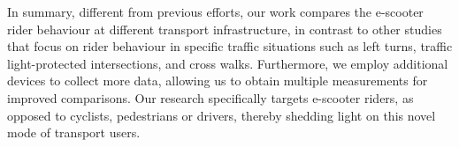 In summary, different from previous efforts, our work compares the e-scooter rider behaviour at different transport infrastructure, in contrast to other studies that focus on rider behaviour in specific traffic situations such as left turns, traffic light-protected intersections, and cross walks. Furthermore, we employ additional devices to collect more data, allowing us to obtain multiple measurements for improved comparisons. Our research specifically targets e-scooter riders, as opposed to cyclists, pedestrians or drivers, thereby shedding light on this novel mode of transport users.